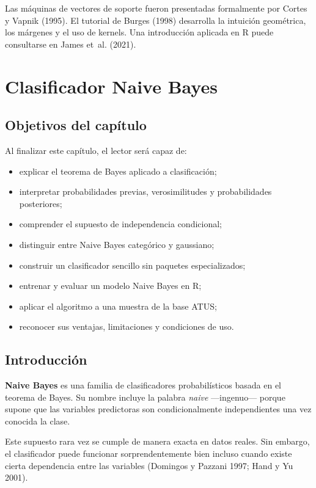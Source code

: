 \documentclass[
  spanish,
  10.5pt,
  letterpaper,
  openany,
  headings=big]{scrbook}
\providecommand{\tightlist}{%
  \setlength{\itemsep}{0pt}\setlength{\parskip}{0pt}}
\begin{document}
Las máquinas de vectores de soporte fueron presentadas formalmente por
Cortes y Vapnik (1995). El tutorial de Burges (1998) desarrolla la
intuición geométrica, los márgenes y el uso de kernels. Una introducción
aplicada en R puede consultarse en James et~al. (2021).


\chapter{Clasificador Naive Bayes}\label{clasificador-naive-bayes}

\section{Objetivos del capítulo}\label{objetivos-del-capuxedtulo-10}

Al finalizar este capítulo, el lector será capaz de:

\begin{itemize}
\tightlist
\item
  explicar el teorema de Bayes aplicado a clasificación;
\item
  interpretar probabilidades previas, verosimilitudes y probabilidades
  posteriores;
\item
  comprender el supuesto de independencia condicional;
\item
  distinguir entre Naive Bayes categórico y gaussiano;
\item
  construir un clasificador sencillo sin paquetes especializados;
\item
  entrenar y evaluar un modelo Naive Bayes en R;
\item
  aplicar el algoritmo a una muestra de la base ATUS;
\item
  reconocer sus ventajas, limitaciones y condiciones de uso.
\end{itemize}

\section{Introducción}\label{introducciuxf3n-6}

\textbf{Naive Bayes} es una familia de clasificadores probabilísticos
basada en el teorema de Bayes. Su nombre incluye la palabra \emph{naive}
---ingenuo--- porque supone que las variables predictoras son
condicionalmente independientes una vez conocida la clase.

Este supuesto rara vez se cumple de manera exacta en datos reales. Sin
embargo, el clasificador puede funcionar sorprendentemente bien incluso
cuando existe cierta dependencia entre las variables (Domingos y Pazzani
1997; Hand y Yu 2001).
\end{document}
